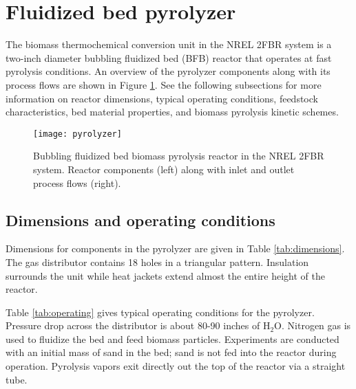 
\section{Fluidized bed pyrolyzer}

The biomass thermochemical conversion unit in the NREL 2FBR system is a two-inch diameter bubbling fluidized bed (BFB) reactor that operates at fast pyrolysis conditions. An overview of the pyrolyzer components along with its process flows are shown in Figure \ref{fig:pyrolyzer}. See the following subsections for more information on reactor dimensions, typical operating conditions, feedstock characteristics, bed material properties, and biomass pyrolysis kinetic schemes.

\begin{figure}[H]
    \centering
    \texttt{[image: pyrolyzer]}
    \caption{Bubbling fluidized bed biomass pyrolysis reactor in the NREL 2FBR system. Reactor components (left) along with inlet and outlet process flows (right).}
    \label{fig:pyrolyzer}
\end{figure}

\subsection{Dimensions and operating conditions}

Dimensions for components in the pyrolyzer are given in Table \ref{tab:dimensions}. The gas distributor contains 18 holes in a triangular pattern. Insulation surrounds the unit while heat jackets extend almost the entire height of the reactor.

Table \ref{tab:operating} gives typical operating conditions for the pyrolyzer. Pressure drop across the distributor is about 80-90 inches of H$_2$O. Nitrogen gas is used to fluidize the bed and feed biomass particles. Experiments are conducted with an initial mass of sand in the bed; sand is not fed into the reactor during operation. Pyrolysis vapors exit directly out the top of the reactor via a straight tube.

